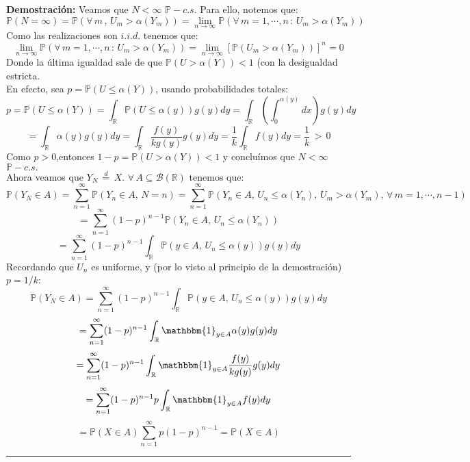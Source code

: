 \documentclass[a4paper]{article}
\numberwithin{equation}{subsection}
\def\R{\mathbb R}
\def\to{\rightarrow}
\newcommand{\pb}{\mathbb{P}}
\begin{document}
\textbf{Demostración: }Veamos que $N<\infty$ $\pb-c.s.$ Para ello, notemos que:
\[\pb(N=\infty) = \pb(\forall\,m\,,\,U_m>\alpha(Y_m)) = \lim_{n \to \infty}\pb(\forall\,m=1,\cdots,n\,:\,U_m>\alpha(Y_m))\]
Como las realizaciones son $i.i.d.$ tenemos que:
\[\lim_{n \to \infty}\pb(\forall\,m=1,\cdots,n\,:\,U_m>\alpha(Y_m)) = \lim_{n \to \infty}\left[\pb(U_m > \alpha(Y_m))\right]^{n} = 0\]
Donde la última igualdad sale de que $\pb(U>\alpha(Y)) < 1$ (con la desigualdad estricta.\\ \newline
En efecto, sea $p=\pb(U\leq \alpha(Y))$, usando probabilidades totales:
\[p = \pb(U\leq \alpha(Y)) = \int_{\R}\pb(U\leq \alpha(y))g(y)dy= \int_{\R}\left(\int_{0}^{\alpha(y)}dx\right)g(y)dy\]
\[=\int_{\R}\alpha(y)g(y)dy = \int_{\R}\frac{f(y)}{kg(y)}g(y)dy = \frac{1}{k}\int_{\R}f(y)dy = \frac{1}{k}\,>\,0\]
Como $p>0$,entonces $1-p = \pb(U>\alpha(Y))<1$ y concluímos que $N<\infty$ $\pb-c.s.$\\ \newline
Ahora veamos que $Y_N \,\overset{d}{=}\,X$. $\forall\,A\subseteq \mathcal{B}(\R)$ tenemos que:
\[\pb(Y_N \in A) = \sum_{n=1}^{\infty}\pb(Y_n \in A,\,N=n) = \sum_{n=1}^{\infty}\pb(Y_n \in A,\,U_n\leq\alpha(Y_n),\,U_m>\alpha(Y_m),\,\forall\,m=1,\cdots,n-1)\]
\[=\sum_{n=1}^{\infty}(1-p)^{n-1}\pb(Y_n \in A,\,U_n\leq \alpha(Y_n))\]\[= \sum_{n=1}^{\infty}(1-p)^{n-1} \int_{\R}\pb(y \in A,\,U_n\leq \alpha(y))g(y)dy\]
Recordando que $U_n$ es uniforme, y (por lo visto al principio de la demostración) $p=1/k$:
\[\pb(Y_N \in A)= \sum_{n=1}^{\infty}(1-p)^{n-1} \int_{\R}\pb(y \in A,\,U_n\leq \alpha(y))g(y)dy\]\[= \sum_{n=1}^{\infty}(1-p)^{n-1}\int_{\R}\mathbbm{1}_{y\in A}\alpha(y)g(y) dy\]
\[=\sum_{n=1}^{\infty}(1-p)^{n-1}\int_{\R}\mathbbm{1}_{y\in A}\frac{f(y)}{kg(y)}g(y) dy\] \[= \sum_{n=1}^{\infty}(1-p)^{n-1}p\int_{\R}\mathbbm{1}_{y\in A}f(y) dy\] \[= \pb(X \in A)\sum_{n=1}^{\infty}p(1-p)^{n-1}= \pb(X\in A)\] 
\rule{0.7em}{0.7em}\\
\end{document}
